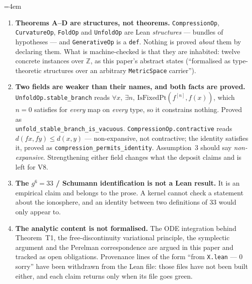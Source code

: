 \documentclass[14pt,a4paper]{extarticle}
\begin{document}
\begingroup
\sloppy\emergencystretch=4em
\begin{enumerate}[label=(\alph*),leftmargin=2.4em]
  \item \textbf{Theorems A--D are structures, not theorems.}
    \texttt{CompressionOp}, \texttt{CurvatureOp}, \texttt{FoldOp} and
    \texttt{UnfoldOp} are Lean \emph{structures} --- bundles of
    hypotheses --- and \texttt{GenerativeOp} is a \texttt{def}. Nothing is
    proved \emph{about} them by declaring them. What is machine-checked is
    that they are inhabited: twelve concrete instances over $\mathbb{Z}$,
    as this paper's abstract states (``formalised as type-theoretic
    structures over an arbitrary \texttt{MetricSpace} carrier'').
  \item \textbf{Two fields are weaker than their names, and both facts are
    proved.} \texttt{UnfoldOp.stable\_branch} reads
    $\forall x,\ \exists n,\ \mathrm{IsFixedPt}(f^{[n]}, f(x))$, which
    $n=0$ satisfies for \emph{every} map on \emph{every} type, so it
    constrains nothing. Proved as\\
    \texttt{unfold\_stable\_branch\_is\_vacuous}.
    \texttt{CompressionOp.contractive} reads
    $d(fx,fy) \le d(x,y)$ --- non-expansive, not contractive; the identity
    satisfies it, proved as \texttt{compression\_permits\_identity}.
    Assumption~3
    should say \emph{non-expansive}. Strengthening either field changes
    what the deposit claims and is left for V8.
  \item \textbf{The $g^6 = 33$ / Schumann identification is not a Lean
    result.} It is an empirical claim and belongs to the prose. A kernel
    cannot check a statement about the ionosphere, and an identity between
    two definitions of 33 would only appear to.
  \item \textbf{The analytic content is not formalised.} The ODE
    integration behind Theorem~T1, the free-discontinuity variational
    principle, the symplectic argument and the Perelman correspondence are
    argued in this paper and tracked as open obligations. Provenance lines
    of the form ``from \texttt{X.lean} --- 0 sorry'' have been withdrawn
    from the Lean file: those files have not been built either, and each
    claim returns only when its file goes green.
\end{enumerate}
\endgroup
\end{document}
